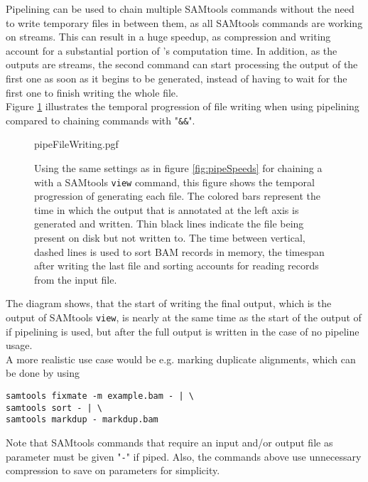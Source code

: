 Pipelining can be used to chain multiple SAMtools commands without the need to write temporary files in between them, as all SAMtools commands are working on streams. This can result in a huge speedup, as compression and writing account for a substantial portion of \sort's computation time. In addition, as the outputs are streams, the second command can start processing the output of the first one as soon as it begins to be generated, instead of having to wait for the first one to finish writing the whole file. \\
Figure \ref{fig:pipeWrite} illustrates the temporal progression of file writing when using pipelining compared to chaining commands with "\texttt{\&\&}".
\begin{figure}[t]
        {pipeFileWriting.pgf}
    \caption{Using the same settings as in figure \ref{fig:pipeSpeeds} for chaining a \sort with a SAMtools \texttt{view} command, this figure shows the temporal progression of generating each file. The colored bars represent the time in which the output that is annotated at the left axis is generated and written. Thin black lines indicate the file being present on disk but not written to. The time between vertical, dashed lines is used to sort BAM records in memory, the timespan after writing the last file and sorting accounts for reading records from the input file. }
    \label{fig:pipeWrite}
\end{figure}
The diagram shows, that the start of writing the final output, which is the output of SAMtools \texttt{view}, is nearly at the same time as the start of the output of \sort if pipelining is used, but after the full output is written in the case of no pipeline usage. \\
A more realistic use case would be e.g. marking duplicate alignments, which can be done by using 
\begin{verbatim} 
samtools fixmate -m example.bam - | \
samtools sort - | \ 
samtools markdup - markdup.bam
\end{verbatim}
Note that SAMtools commands that require an input and/or output file as parameter must be given "\texttt{-}" if piped. Also, the commands above use unnecessary compression to save on parameters for simplicity. \\

